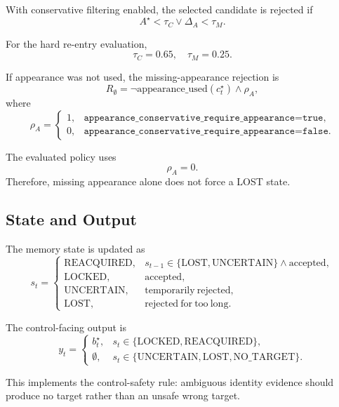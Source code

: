 With conservative filtering enabled, the selected candidate is rejected if
\begin{equation}
A^\star < \tau_C
\lor
\Delta_A < \tau_M.
\end{equation}

For the hard re-entry evaluation,
\begin{equation}
\tau_C = 0.65,
\quad
\tau_M = 0.25.
\end{equation}

If appearance was not used, the missing-appearance rejection is
\begin{equation}
R_\emptyset =
\neg \mathrm{appearance\_used}(c_t^\star)
\land
\rho_A,
\end{equation}
where
\begin{equation}
\rho_A =
\begin{cases}
1, & \texttt{appearance\_conservative\_require\_appearance=true},\\
0, & \texttt{appearance\_conservative\_require\_appearance=false}.
\end{cases}
\end{equation}

The evaluated policy uses
\begin{equation}
\rho_A = 0.
\end{equation}
Therefore, missing appearance alone does not force a LOST state.

\subsection{State and Output}

The memory state is updated as
\begin{equation}
s_t =
\begin{cases}
\mathrm{REACQUIRED}, & s_{t-1}\in\{\mathrm{LOST},\mathrm{UNCERTAIN}\} \land \mathrm{accepted},\\
\mathrm{LOCKED}, & \mathrm{accepted},\\
\mathrm{UNCERTAIN}, & \mathrm{temporarily\ rejected},\\
\mathrm{LOST}, & \mathrm{rejected\ for\ too\ long}.
\end{cases}
\end{equation}

The control-facing output is
\begin{equation}
y_t =
\begin{cases}
b_t^\star, & s_t\in\{\mathrm{LOCKED},\mathrm{REACQUIRED}\},\\
\emptyset, & s_t\in\{\mathrm{UNCERTAIN},\mathrm{LOST},\mathrm{NO\_TARGET}\}.
\end{cases}
\end{equation}

This implements the control-safety rule: ambiguous identity evidence should produce no target rather than an unsafe wrong target.
